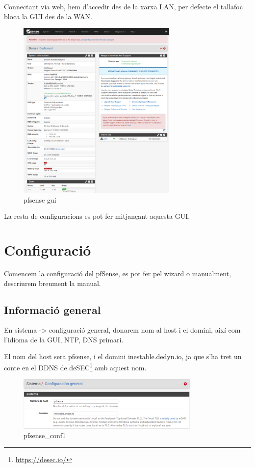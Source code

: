 \documentclass[
  10pt,
]{krantz}
\DeclareRobustCommand{\href}[2]{#2\footnote{\url{#1}}}
\begin{document}
Connectant via web, hem d'accedir des de la xarxa LAN, per defecte el tallafoc bloca la GUI des de la WAN.

\begin{figure}
\centering
\includegraphics[width=0.7\textwidth,height=\textheight]{imatges/proxmox/pfsense-GUI.png}
\caption{pfsense gui}
\end{figure}

La resta de configuracions es pot fer mitjançant aquesta GUI.

\hypertarget{configuraciuxf3}{%
\section{Configuració}\label{configuraciuxf3}}

Comencem la configuració del pfSense, es pot fer pel wizard o manualment, descriurem breument la manual.

\hypertarget{informaciuxf3-general}{%
\subsection{Informació general}\label{informaciuxf3-general}}

En sistema -\textgreater{} configuració general, donarem nom al host i el domini, així com l'idioma de la GUI, NTP, DNS primari.

El nom del host sera pfsense, i el domini inestable.dedyn.io, ja que s'ha tret un conte en el DDNS de \href{https://desec.io/}{deSEC} amb aquest nom.

\begin{figure}
\centering
\includegraphics[width=0.8\textwidth,height=\textheight]{imatges/pfsense_conf1.png}
\caption{pfsense\_conf1}
\end{figure}
\end{document}
